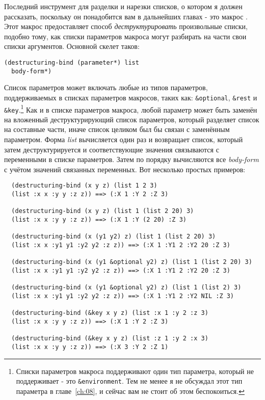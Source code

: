 Последний инструмент для разделки и нарезки списков, о котором я должен рассказать,
поскольку он понадобится вам в дальнейших главах - это макрос
. Этот макрос предоставляет способ \textit{деструктурировать}
произвольные списки, подобно тому, как списки параметров макроса могут разбирать на части
свои списки аргументов. Основной скелет  таков:

\begin{lstlisting}
(destructuring-bind (parameter*) list
  body-form*)
\end{lstlisting}

Список параметров может включать любые из типов параметров, поддерживаемых в списках
параметров макросов, таких как: \lstinline!&optional!, \lstinline!&rest! и
\lstinline!&key!.\footnote{Списки параметров макроса поддерживают один тип параметра,
  который не поддерживает  - это \lstinline!&environment!. Тем не
  менее я не обсуждал этот тип параметра в главе~\ref{ch:08}, и сейчас вам не стоит об
  этом беспокоиться.} Как и в списке параметров макроса, любой параметр может быть заменён
на вложенный деструктурирующий список параметров, который разделяет список на составные
части, иначе список целиком был бы связан с заменённым параметром. Форма \textit{list}
вычисляется один раз и возвращает список, который затем деструктурируется и
соответствующие значения связываются с переменными в списке параметров. Затем по порядку
вычисляются все \textit{body-form} с учётом значений связанных переменных. Вот несколько
простых примеров:
  
\begin{verbatim}
  (destructuring-bind (x y z) (list 1 2 3)
  (list :x x :y y :z z)) ==> (:X 1 :Y 2 :Z 3)
  
  (destructuring-bind (x y z) (list 1 (list 2 20) 3)
  (list :x x :y y :z z)) ==> (:X 1 :Y (2 20) :Z 3)
  
  (destructuring-bind (x (y1 y2) z) (list 1 (list 2 20) 3)
  (list :x x :y1 y1 :y2 y2 :z z)) ==> (:X 1 :Y1 2 :Y2 20 :Z 3)
  
  (destructuring-bind (x (y1 &optional y2) z) (list 1 (list 2 20) 3)
  (list :x x :y1 y1 :y2 y2 :z z)) ==> (:X 1 :Y1 2 :Y2 20 :Z 3)
  
  (destructuring-bind (x (y1 &optional y2) z) (list 1 (list 2) 3)
  (list :x x :y1 y1 :y2 y2 :z z)) ==> (:X 1 :Y1 2 :Y2 NIL :Z 3)
  
  (destructuring-bind (&key x y z) (list :x 1 :y 2 :z 3)
  (list :x x :y y :z z)) ==> (:X 1 :Y 2 :Z 3)
  
  (destructuring-bind (&key x y z) (list :z 1 :y 2 :x 3)
  (list :x x :y y :z z)) ==> (:X 3 :Y 2 :Z 1)
\end{verbatim}

